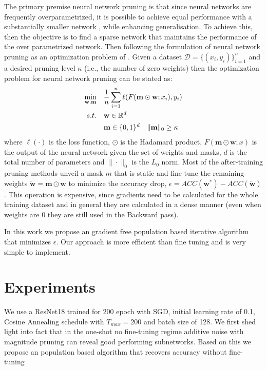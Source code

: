 \documentclass[nohyperref]{article}
\theoremstyle{plain}
\theoremstyle{definition}
\theoremstyle{remark}
\begin{document}
The primary premise neural network pruning is that since neural networks are frequently overparametrized, it is possible to achieve equal performance with a substantially smaller network \cite{reedPruningAlgorithmsaSurvey1993}, while enhancing generalisation.
To achieve this, then the objective is to find a sparse network that maintains
the performance of the over parametrized network. Then following the
formulation of neural network pruning as an optimization problem of
\cite{leeSNIPSINGLESHOTNETWORK2018}. Given a dataset $\mathcal{D}=\{(x_i,y_i)\} _{i=1}^{n}$
and a desired pruning level $\kappa$ (i.e., the number of zero weights) then
the optimization problem for neural network pruning can be stated as:
\begin{equation}
     \centering
    \begin{aligned}
          \underset{\mathbf{w,m}}{\min}\quad&  \frac{1}{n} \sum_{i=1}^{n}
          \ell(F(\mathbf{m}\odot \textbf{w};x_i),y_i)     \\
    \label{eq:pruning_optim_problem}
           s.t.\quad & \mathbf{w}\in \mathbb{R}^d\\
           \quad & \mathbf{m}\in \{0,1\}^d\quad \|\mathbf{m}\|_0 \geq \kappa
       \end{aligned}
\end{equation}
           where $\ell(\cdot)$ is the loss function, $\odot$ is the
           Hadamard product, $F(\mathbf{m}\odot \textbf{w};x)$ is the output
           of the neural network given the set of weights and masks, $d$ is the total number of
           parameters and $\|\cdot\|_0$ is the $L_0$ norm.
Most of the after-training pruning methods unveil a mask $m$ that is
static and fine-tune the remaining weights $\tilde{\mathbf{w}}=\mathbf{m}
\odot\mathbf{w}$ to minimize the accuracy drop, $\epsilon= ACC(\mathbf{w^*})
-ACC(\mathbf{\tilde{w}})$. This operation is expensive, since gradients need to be calculated for
the whole training dataset and in general they are calculated in a dense
manner (even when weights are 0 they are still used in the Backward pass). 



In this work we propose an gradient free population based iterative algorithm
that minimizes $\epsilon$. Our approach is more efficient than fine tuning and
is very simple to implement.
\section{Experiments}
We use a ResNet18 \cite{heDeepResidualLearning2015} trained for 200 epoch with
SGD, initial learning rate of  0.1, Cosine Annealing schedule with $T_{max}=200$ and batch size of 128.
We first shed light into fact that in the one-shot no fine-tuning regime
additive noise with magnitude pruning can reveal good performing subnetworks.
Based on this we propose an population based algorithm that recovers accuracy
without fine-tuning
\end{document}
